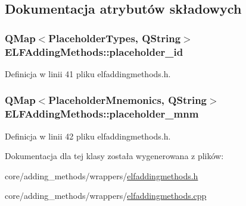 \subsection{Dokumentacja atrybutów składowych}
\hypertarget{class_e_l_f_adding_methods_a108205cdbf268927f0b64c2a783a96d5}{
\subsubsection[{placeholder\-\_\-id}]{\setlength{\rightskip}{0pt plus 5cm}Q\-Map$<${\bf Placeholder\-Types}, Q\-String$>$ E\-L\-F\-Adding\-Methods\-::placeholder\-\_\-id\hspace{0.3cm}{\ttfamily [private]}}}\label{class_e_l_f_adding_methods_a108205cdbf268927f0b64c2a783a96d5}


Definicja w linii 41 pliku elfaddingmethods.\-h.

\hypertarget{class_e_l_f_adding_methods_ad77df886acfad79f1b705f5ff1976e4a}{
\subsubsection[{placeholder\-\_\-mnm}]{\setlength{\rightskip}{0pt plus 5cm}Q\-Map$<${\bf Placeholder\-Mnemonics}, Q\-String$>$ E\-L\-F\-Adding\-Methods\-::placeholder\-\_\-mnm\hspace{0.3cm}{\ttfamily [private]}}}\label{class_e_l_f_adding_methods_ad77df886acfad79f1b705f5ff1976e4a}


Definicja w linii 42 pliku elfaddingmethods.\-h.



Dokumentacja dla tej klasy została wygenerowana z plików\-:\begin{DoxyCompactItemize}
\item 
core/adding\-\_\-methods/wrappers/\hyperlink{elfaddingmethods_8h}{elfaddingmethods.\-h}\item 
core/adding\-\_\-methods/wrappers/\hyperlink{elfaddingmethods_8cpp}{elfaddingmethods.\-cpp}\end{DoxyCompactItemize}
